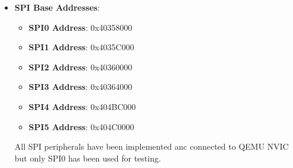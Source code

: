 \begin{itemize}
    \item {\textbf{SPI Base Addresses}:
        \begin{itemize}
            \item \textbf{SPI0 Address}: 0x40358000
            \item \textbf{SPI1 Address}: 0x4035C000
            \item \textbf{SPI2 Address}: 0x40360000
            \item \textbf{SPI3 Address}: 0x40364000
            \item \textbf{SPI4 Address}: 0x404BC000
            \item \textbf{SPI5 Address}: 0x404C0000
        \end{itemize}
        All SPI peripherals have been implemented anc connected to QEMU NVIC but only SPI0 has been used for testing.
    }
\end{itemize}